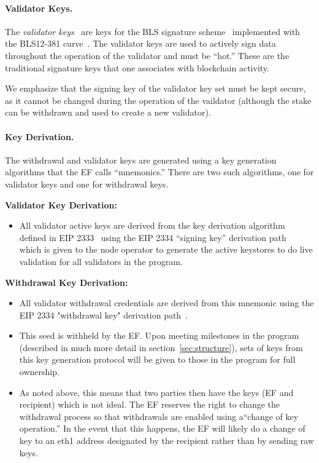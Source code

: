 \paragraph{Validator Keys.}  The \emph{validator keys}~\cite{EthVal} are keys for the BLS signature scheme~\cite{AC:BonLynSha01} implemented with the BLS12-381 curve~\cite{BLS12-318}.  The validator keys are used to actively sign data throughout the operation of the validator and must be ``hot.'' These are the traditional signature keys that one associates with blockchain activity.

We emphasize that the signing key of the validator key set must be kept secure, as it cannot be changed during the operation of the vaildator (although the stake can be withdrawn and used to create a new validator).

\paragraph{Key Derivation.}  The withdrawal and validator keys are generated using a key generation algorithms that the EF calls ``mnemonics.'' There are two such algorithms, one for validator keys and one for withdrawal keys. 

\textbf{Validator Key Derivation:}
\begin{itemize}
 \item All validator active keys are derived from the key derivation algorithm defined in EIP 2333~\cite{EthBLSKeyGen} using the EIP 2334 ``signing key'' derivation path~\cite{EthBLSHierarchy} which is
given to the node operator to generate the active keystores to do live validation for all validators in the program.
\end{itemize}

\textbf{Withdrawal Key Derivation:}
\begin{itemize}
\item All validator withdrawal credentials are derived from this mnemonic using the EIP 2334 "withdrawal key" derivation path~\cite{EthBLSHierarchy}.
\item This seed is withheld by the EF. Upon meeting milestones in the program (described in much more detail in section~\ref{sec:structure}), sets of keys from this key generation protocol will be given to those in the program for full ownership.
\item  As noted above, this means that two parties then have the keys (EF and recipient) which is not ideal.  The EF reserves the right to change the withdrawal process so that withdrawals are enabled using a``change of key operation.'' In the event that this happens, the EF will likely do a change of key to an eth1 address designated by the recipient rather than by sending raw keys. 
\end{itemize}

